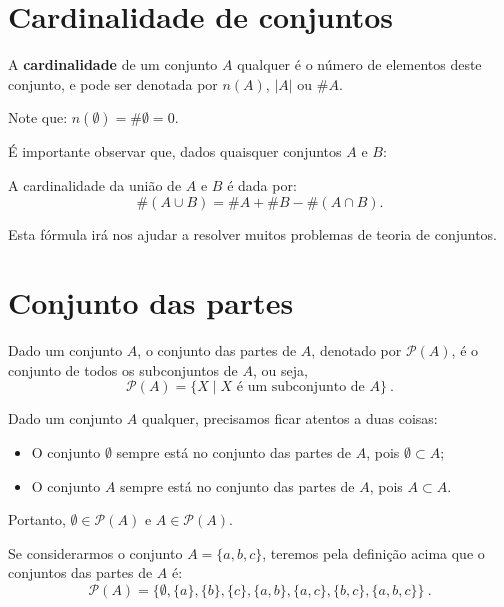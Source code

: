 \section{Cardinalidade de conjuntos}

 A \textbf{cardinalidade} de um conjunto $A$ qualquer é o número de elementos deste conjunto, e pode ser denotada por $n(A)$, $|A|$ ou $\# A$.

 Note que: $n(\emptyset)= \# \emptyset= 0$.

 É importante observar que, dados quaisquer conjuntos $A$ e $B$:
 \vskip0.3cm
 \colorbox{azul}{
 \begin{minipage}{0.9\linewidth}
 \begin{center}
 A cardinalidade da união de $A$ e $B$ é dada por:
\begin{equation}
\#(A \cup B)= \# A + \# B - \#(A \cap B) .
\end{equation}
 \end{center}
 \end{minipage}}
 \vskip0.3cm

 Esta fórmula irá nos ajudar a resolver muitos problemas de teoria de conjuntos.

 \section{Conjunto das partes}

 Dado um conjunto $A$, o conjunto das partes de $A$, denotado por $\mathcal{P}(A)$, é o conjunto de todos os subconjuntos de $A$, ou seja,
\begin{equation}
\mathcal{P}(A)= \{X \mid X \text{ é um subconjunto de } A\} \ .
\end{equation}

 Dado um conjunto $A$ qualquer, precisamos ficar atentos a duas coisas:
 \begin{itemize}
 \item O conjunto $\emptyset$ sempre está no conjunto das partes de $A$, pois $\emptyset \subset A$;
 \item O conjunto $A$ sempre está no conjunto das partes de $A$, pois $A \subset A$.
 \end{itemize}
 Portanto, $\emptyset \in \mathcal{P}(A)$ e $A \in \mathcal{P}(A)$.

 \begin{exem}\label{ex:partes-abc}
 Se considerarmos o conjunto $A= \{a, b, c\}$, teremos pela definição acima que o conjuntos das partes de $A$ é:
\begin{equation}
\mathcal{P}(A)= \{ \emptyset, \{a\}, \{b\}, \{c\}, \{a, b\}, \{a, c\}, \{b, c\}, \{a, b, c\} \} \ .
\end{equation}
 \end{exem}

